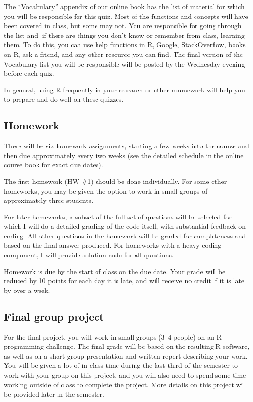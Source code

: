 \documentclass[]{book}
\begin{document}
The ``Vocabulary'' appendix of our online book has the list of material for which you will be responsible for this quiz. Most of the functions and concepts will have been covered in class, but some may not. You are responsible for going through the list and, if there are things you don't know or remember from class, learning them. To do this, you can use help functions in R, Google, StackOverflow, books on R, ask a friend, and any other resource you can find. The final version of the Vocabulary list you will be responsible will be posted by the Wednesday evening before each quiz.

In general, using R frequently in your research or other coursework will help you to prepare and do well on these quizzes.

\hypertarget{homework}{%
\subsection{Homework}\label{homework}}

There will be six homework assignments, starting a few weeks into the course and then due approximately every two weeks (see the detailed schedule in the online course book for exact due dates).

The first homework (HW \#1) should be done individually. For some other homeworks, you may be given the option to work in small groups of approximately three students.

For later homeworks, a subset of the full set of questions will be selected for which I will do a detailed grading of the code itself, with substantial feedback on coding. All other questions in the homework will be graded for completeness and based on the final answer produced. For homeworks with a heavy coding component, I will provide solution code for all questions.

Homework is due by the start of class on the due date. Your grade will be reduced by 10 points for each day it is late, and will receive no credit if it is late by over a week.

\hypertarget{final-group-project}{%
\subsection{Final group project}\label{final-group-project}}

For the final project, you will work in small groups (3--4 people) on an R programming challenge. The final grade will be based on the resulting R software, as well as on a short group presentation and written report describing your work. You will be given a lot of in-class time during the last third of the semester to work with your group on this project, and you will also need to spend some time working outside of class to complete the project. More details on this project will be provided later in the semester.
\end{document}
